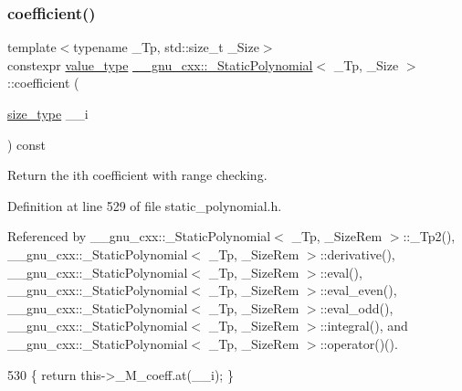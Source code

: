 \subsubsection{\texorpdfstring{coefficient()}{coefficient()}\hspace{0.1cm}{\footnotesize\ttfamily [1/2]}}
{\footnotesize\ttfamily template$<$typename \+\_\+\+Tp, std\+::size\+\_\+t \+\_\+\+Size$>$ \\
constexpr \hyperlink{class____gnu__cxx_1_1__StaticPolynomial_aad5f3d6d5876b6926b30724aeac649d6}{value\+\_\+type} \hyperlink{class____gnu__cxx_1_1__StaticPolynomial}{\+\_\+\+\_\+gnu\+\_\+cxx\+::\+\_\+\+Static\+Polynomial}$<$ \+\_\+\+Tp, \+\_\+\+Size $>$\+::coefficient (\begin{DoxyParamCaption}\item[{\hyperlink{class____gnu__cxx_1_1__StaticPolynomial_a0cc0aa4adab35686ef2474e07f511ff9}{size\+\_\+type}}]{\+\_\+\+\_\+i }\end{DoxyParamCaption}) const\hspace{0.3cm}{\ttfamily [inline]}}

Return the {\ttfamily ith} coefficient with range checking. 

Definition at line 529 of file static\+\_\+polynomial.\+h.



Referenced by \+\_\+\+\_\+gnu\+\_\+cxx\+::\+\_\+\+Static\+Polynomial$<$ \+\_\+\+Tp, \+\_\+\+Size\+Rem $>$\+::\+\_\+\+Tp2(), \+\_\+\+\_\+gnu\+\_\+cxx\+::\+\_\+\+Static\+Polynomial$<$ \+\_\+\+Tp, \+\_\+\+Size\+Rem $>$\+::derivative(), \+\_\+\+\_\+gnu\+\_\+cxx\+::\+\_\+\+Static\+Polynomial$<$ \+\_\+\+Tp, \+\_\+\+Size\+Rem $>$\+::eval(), \+\_\+\+\_\+gnu\+\_\+cxx\+::\+\_\+\+Static\+Polynomial$<$ \+\_\+\+Tp, \+\_\+\+Size\+Rem $>$\+::eval\+\_\+even(), \+\_\+\+\_\+gnu\+\_\+cxx\+::\+\_\+\+Static\+Polynomial$<$ \+\_\+\+Tp, \+\_\+\+Size\+Rem $>$\+::eval\+\_\+odd(), \+\_\+\+\_\+gnu\+\_\+cxx\+::\+\_\+\+Static\+Polynomial$<$ \+\_\+\+Tp, \+\_\+\+Size\+Rem $>$\+::integral(), and \+\_\+\+\_\+gnu\+\_\+cxx\+::\+\_\+\+Static\+Polynomial$<$ \+\_\+\+Tp, \+\_\+\+Size\+Rem $>$\+::operator()().


\begin{DoxyCode}
530       \{ \textcolor{keywordflow}{return} this->\_M\_coeff.at(\_\_i); \}
\end{DoxyCode}
\mbox{\label{class____gnu__cxx_1_1__StaticPolynomial_a70fb64837727e4fea0dfe0bf5c8a4523}} 
